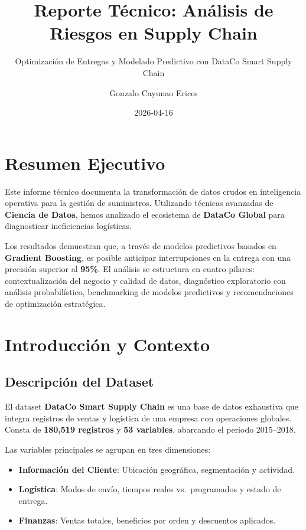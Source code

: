 \documentclass[
  letterpaper,
  DIV=11,
  numbers=noendperiod]{scrartcl}
\title{Reporte Técnico: Análisis de Riesgos en Supply Chain}
\subtitle{Optimización de Entregas y Modelado Predictivo con DataCo
Smart Supply Chain}
\author{Gonzalo Cayunao Erices}
\date{2026-04-16}
\providecommand{\tightlist}{%
  \setlength{\itemsep}{0pt}\setlength{\parskip}{0pt}}
\renewcommand*\contentsname{Table of contents}
\newcommand\contentsname{Table of contents}
\begin{document}
\maketitle

\renewcommand*\contentsname{Table of contents}
{
\setcounter{tocdepth}{3}
\tableofcontents
}

\section{Resumen Ejecutivo}\label{resumen-ejecutivo}

Este informe técnico documenta la transformación de datos crudos en
inteligencia operativa para la gestión de suministros. Utilizando
técnicas avanzadas de \textbf{Ciencia de Datos}, hemos analizado el
ecosistema de \textbf{DataCo Global} para diagnosticar ineficiencias
logísticas.

Los resultados demuestran que, a través de modelos predictivos basados
en \textbf{Gradient Boosting}, es posible anticipar interrupciones en la
entrega con una precisión superior al \textbf{95\%}. El análisis se
estructura en cuatro pilares: contextualización del negocio y calidad de
datos, diagnóstico exploratorio con análisis probabilístico,
benchmarking de modelos predictivos y recomendaciones de optimización
estratégica.

\section{Introducción y Contexto}\label{introducciuxf3n-y-contexto}

\subsection{Descripción del Dataset}\label{descripciuxf3n-del-dataset}

El dataset \textbf{DataCo Smart Supply Chain} es una base de datos
exhaustiva que integra registros de ventas y logística de una empresa
con operaciones globales. Consta de \textbf{180,519 registros} y
\textbf{53 variables}, abarcando el periodo 2015--2018.

Las variables principales se agrupan en tres dimensiones:

\begin{itemize}
\tightlist
\item
  \textbf{Información del Cliente}: Ubicación geográfica, segmentación y
  actividad.
\item
  \textbf{Logística}: Modos de envío, tiempos reales vs.~programados y
  estado de entrega.
\item
  \textbf{Finanzas}: Ventas totales, beneficios por orden y descuentos
  aplicados.
\end{itemize}
\end{document}
